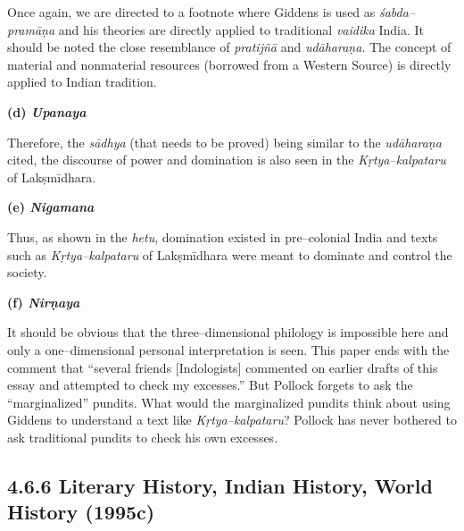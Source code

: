 Once again, we are directed to a footnote where Giddens is used as \textit{śabda–pramāṇa} and his theories are directly applied to traditional \textit{vaidika} India. It should be noted the close resemblance of \textit{pratijñā} and \textit{udāharaṇa}. The concept of material and nonmaterial resources (borrowed from a Western Source) is directly applied to Indian tradition.

\textbf{(d) \textit{Upanaya}}

Therefore, the \textit{sādhya} (that needs to be proved) being similar to the \textit{udāharaṇa} cited, the discourse of power and domination is also seen in the \textit{Kṛtya–kalpataru} of Lakṣmīdhara.


\textbf{(e) \textit{Nigamana}}

Thus, as shown in the \textit{hetu}, domination existed in pre–colonial India and texts such as \textit{Kṛtya–kalpataru} of Lakṣmīdhara were meant to dominate and control the society.

\textbf{(f) \textit{Nirṇaya}}

It should be obvious that the three–dimensional philology is impossible here and only a one–dimensional personal interpretation is seen. This paper ends with the comment that “several friends [Indologists] commented on earlier drafts of this essay and attempted to check my excesses.” But Pollock forgets to ask the “marginalized” pundits. What would the marginalized pundits think about using Giddens to understand a text like \textit{Kṛtya–kalpataru}? Pollock has never bothered to ask traditional pundits to check his own excesses.

\vspace{-.3cm}

\subsection*{4.6.6 Literary History, Indian History, World History (1995c)}

\vspace{-.2cm}

